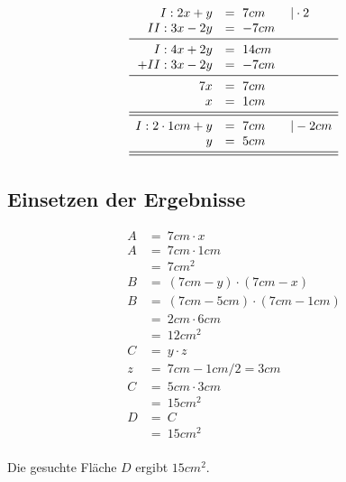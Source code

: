 \documentclass[a4paper, 11pt, ngerman, twocolumn]{article}
\begin{document}
		\begin{equation*}
		\begin{array}{rl} 
		I: 2x + y &=\ 7cm \qquad \text{\textbar} \cdot2\\
		II: 3x - 2y &=\ -7cm \\
		\midrule
		I: 4x + 2y &=\ 14cm \\
		+ II: 3x - 2y &=\ -7cm \\
		\midrule
		7x &=\ 7cm \\
		x	&=\ 1cm \\ 
		\midrule
		\midrule
		I: 2 \cdot 1cm + y &=\ 7cm \qquad \text{\textbar} -2cm\\
		y &=\ 5cm \\
		\midrule
		\midrule
		\end{array}
		\end{equation*}
		
		\subsection{Einsetzen der Ergebnisse} 
	 	\begin{equation*}
	 	\begin{array}{rl}
		 	A &=\ 7cm \cdot x \\
		 	A &=\ 7cm \cdot 1cm \\
		 	  &=\ 7cm^2 \\
		 	B &=\ (7cm - y) \cdot (7cm - x) \\
		 	B &=\ (7cm - 5cm) \cdot (7cm - 1cm) \\
		 	  &=\  2cm \cdot 6cm \\
		 	  &=\ 12cm^2 \\
		 	C &=\ y \cdot z \\
		 	z &=\ 7cm - 1cm / 2 = 3cm \\
		 	C &=\ 5cm \cdot 3cm \\
		 	  &=\ 15cm^2 \\
		 	D &=\ C \\
		 	  &=\ 15cm^2 \\ 
	 	\end{array}
	 	\end{equation*}
	 	
		 \begin{center}
		 	\begin{framed}
 		 	Die gesuchte Fläche $D$ ergibt $15cm^2$.
 		 	\end{framed}
		 \end{center}
		 
 
		
\end{document}
